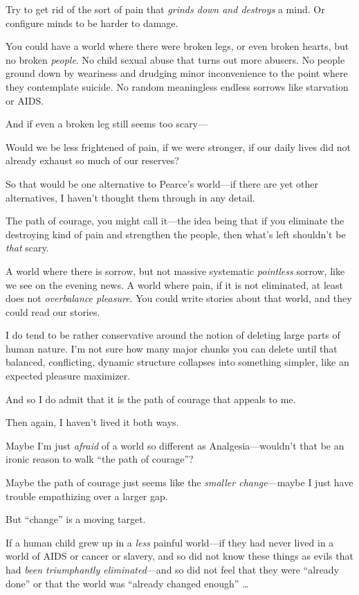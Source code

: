 {
 Try to get rid of the sort of pain that \textit{grinds down and
destroys} a mind. Or configure minds to be harder to damage.}

{
 You could have a world where there were broken legs, or even
broken hearts, but no broken \textit{people}. No child sexual abuse
that turns out more abusers. No people ground down by weariness and
drudging minor inconvenience to the point where they contemplate
suicide. No random meaningless endless sorrows like starvation or
AIDS.}

{
 And if even a broken leg still seems too scary---}

{
 Would we be less frightened of pain, if we were stronger, if our
daily lives did not already exhaust so much of our reserves?}

{
 So that would be one alternative to Pearce's
world---if there are yet other alternatives, I haven't
thought them through in any detail.}

{
 The path of courage, you might call it---the idea being that if
you eliminate the destroying kind of pain and strengthen the people,
then what's left shouldn't be
\textit{that} scary.}

{
 A world where there is sorrow, but not massive systematic
\textit{pointless} sorrow, like we see on the evening news. A world
where pain, if it is not eliminated, at least does not
\textit{overbalance pleasure}. You could write stories about that
world, and they could read our stories.}

{
 I do tend to be rather conservative around the notion of deleting
large parts of human nature. I'm not sure how many
major chunks you can delete until that balanced, conflicting, dynamic
structure collapses into something simpler, like an expected pleasure
maximizer.}

{
 And so I do admit that it is the path of courage that appeals to
me.}

{
 Then again, I haven't lived it both ways.}

{
 Maybe I'm just \textit{afraid} of a world so
different as Analgesia---wouldn't that be an ironic
reason to walk ``the path of
courage''?}

{
 Maybe the path of courage just seems like the \textit{smaller
change}{}---maybe I just have trouble empathizing over a larger gap.}

{
 But ``change'' is a moving
target.}

{
 If a human child grew up in a \textit{less} painful world---if
they had never lived in a world of AIDS or cancer or slavery, and so
did not know these things as evils that had \textit{been triumphantly
eliminated}{}---and so did not feel that they were
``already done'' or that the world
was ``already changed enough''
\ldots}

